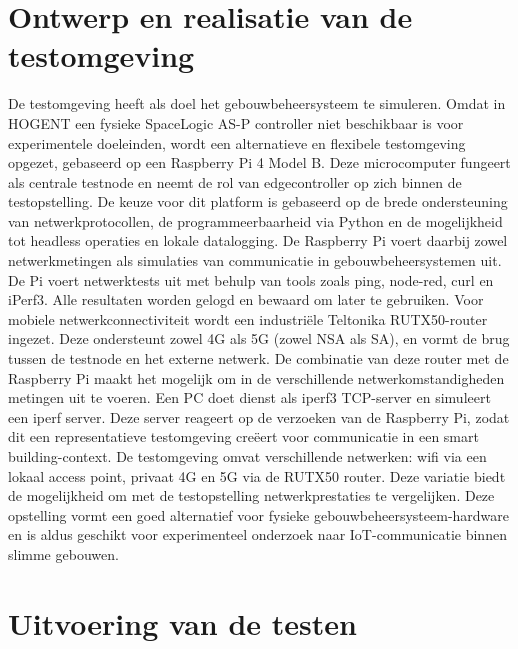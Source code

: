\section{Ontwerp en realisatie van de testomgeving}

De testomgeving heeft als doel het gebouwbeheersysteem te simuleren. Omdat in HOGENT een fysieke SpaceLogic AS-P controller niet beschikbaar is voor experimentele doeleinden, wordt een alternatieve en flexibele testomgeving opgezet, gebaseerd op een Raspberry Pi 4 Model B. Deze microcomputer fungeert als centrale testnode en neemt de rol van edgecontroller op zich binnen de testopstelling. 
De keuze voor dit platform is gebaseerd op de brede ondersteuning van netwerkprotocollen, de programmeerbaarheid via Python en de mogelijkheid tot headless operaties en lokale datalogging. De Raspberry Pi voert daarbij zowel netwerkmetingen als simulaties van communicatie in gebouwbeheersystemen uit.
De Pi voert netwerktests uit met behulp van tools zoals ping, node-red, curl en iPerf3. Alle resultaten worden gelogd en bewaard om later te gebruiken.
Voor mobiele netwerkconnectiviteit wordt een industriële Teltonika RUTX50-router ingezet. Deze ondersteunt zowel 4G als 5G (zowel NSA als SA), en vormt de brug tussen de testnode en het externe netwerk. De combinatie van deze router met de Raspberry Pi maakt het mogelijk om in de verschillende netwerkomstandigheden metingen uit te voeren.
Een PC doet dienst als iperf3 TCP-server en simuleert een iperf server. Deze server reageert op de verzoeken van de Raspberry Pi, zodat dit een representatieve testomgeving creëert voor communicatie in een smart building-context.
De testomgeving omvat verschillende netwerken: wifi via een lokaal access point, privaat 4G en 5G via de RUTX50 router. Deze variatie biedt de mogelijkheid om met de testopstelling netwerkprestaties te vergelijken.
Deze opstelling vormt een goed alternatief voor fysieke gebouwbeheersysteem-hardware en is aldus geschikt voor experimenteel onderzoek naar IoT-communicatie binnen slimme gebouwen.


\section{Uitvoering van de testen}

